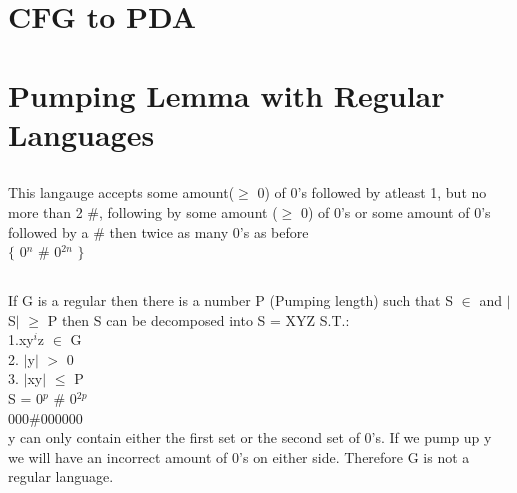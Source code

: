 \documentclass[10pt,a4paper]{article}
\begin{document}
\section{CFG to PDA}


\section{Pumping Lemma with Regular Languages}
\subsection{}
	This langauge accepts some amount($\geq$ 0) of 0's followed by atleast 1, but no more than 2 \#, 			following by some amount ($\geq$ 0) of 0's or some amount of 0's followed by a \# then twice as 			many 0's as before\\
	$\lbrace$ 0$^{n}$ \# 0$^{2n}$ $\rbrace$

\subsection{}
	If G is a regular then there is a number P (Pumping length) such that S $\in$ and $\mid$S$					\mid$ $\geq$ P then S can be decomposed into S = XYZ S.T.: \\
		1.xy$^{i}$z $\in$ G\\
		2. $\mid$y$\mid$ $>$ 0 \\ 
		3. $\mid$xy$\mid$ $\leq$ P\\
		
	S = 0$^{p}$ \#  0$^{2p}$\\
	000\#000000\\
	y can only contain either the first set or the second set of 0's. If we pump up y we will have an    	incorrect amount of 0's on either side. Therefore G is not a regular language. 
	
\end{document}
